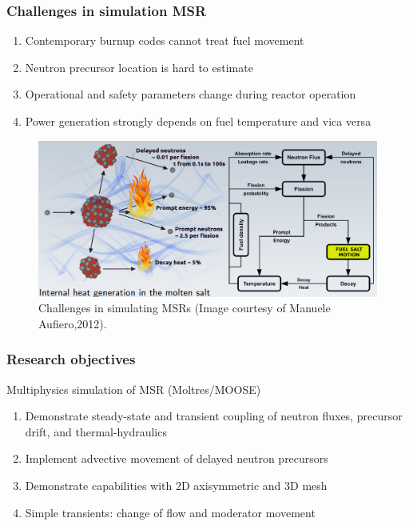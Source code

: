 \begin{frame}
  \frametitle{Challenges in simulation \gls{MSR}}
                  \vspace*{-0.05in}
               \begin{enumerate}
                \item Contemporary burnup codes cannot treat fuel movement
                \item Neutron precursor location is hard to estimate
                \item Operational and safety parameters change during reactor operation
                \item Power generation strongly depends on fuel temperature and vica versa
               \end{enumerate}

           \begin{figure}[t]
                \vspace*{-0.05in}
			\hspace*{-0.2in}
                \includegraphics[height=0.47\textwidth]{./images/coupled_physics.png}
		\vspace*{-0.05in}
		\caption{Challenges in simulating \glspl{MSR} (Image courtesy of Manuele Aufiero,2012).}
     	 \end{figure}               
\end{frame}

\begin{frame}
  \frametitle{Research objectives}
                  \vspace*{-0.1in}

              \begin{block}{Multiphysics simulation of \gls{MSR} (Moltres/MOOSE)\cite{lindsay_introduction_2018}}
               \begin{enumerate}
                \item Demonstrate steady-state and transient coupling of neutron fluxes, precursor drift, and thermal-hydraulics
                \item Implement advective movement of delayed neutron precursors
                \item Demonstrate capabilities with 2D axisymmetric and 3D mesh
                \item Simple transients: change of flow and moderator movement
               \end{enumerate}
               \end{block}


              
\end{frame}
